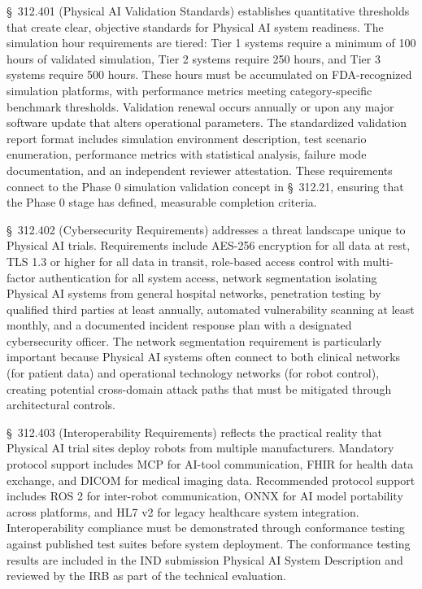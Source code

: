 \S~312.401 (Physical AI Validation Standards) establishes quantitative
thresholds that create clear, objective standards for Physical AI system
readiness. The simulation hour requirements are tiered: Tier 1 systems require
a minimum of 100 hours of validated simulation, Tier 2 systems require 250
hours, and Tier 3 systems require 500 hours. These hours must be accumulated
on FDA-recognized simulation platforms, with performance metrics meeting
category-specific benchmark thresholds. Validation renewal occurs annually or
upon any major software update that alters operational parameters. The
standardized validation report format includes simulation environment
description, test scenario enumeration, performance metrics with statistical
analysis, failure mode documentation, and an independent reviewer attestation.
These requirements connect to the Phase 0 simulation validation concept in
\S~312.21, ensuring that the Phase 0 stage has defined, measurable completion
criteria.

\S~312.402 (Cybersecurity Requirements) addresses a threat landscape unique to
Physical AI trials. Requirements include AES-256 encryption for all data at
rest, TLS 1.3 or higher for all data in transit, role-based access control
with multi-factor authentication for all system access, network segmentation
isolating Physical AI systems from general hospital networks, penetration
testing by qualified third parties at least annually, automated vulnerability
scanning at least monthly, and a documented incident response plan with a
designated cybersecurity officer. The network segmentation requirement is
particularly important because Physical AI systems often connect to both
clinical networks (for patient data) and operational technology networks (for
robot control), creating potential cross-domain attack paths that must be
mitigated through architectural controls.

\S~312.403 (Interoperability Requirements) reflects the practical reality that
Physical AI trial sites deploy robots from multiple manufacturers. Mandatory
protocol support includes MCP \cite{mcp-protocol} for AI-tool communication,
FHIR \cite{hl7-fhir} for health data exchange, and DICOM \cite{dicom} for
medical imaging data. Recommended protocol support includes ROS 2 for
inter-robot communication, ONNX for AI model portability across platforms, and
HL7 v2 for legacy healthcare system integration. Interoperability compliance
must be demonstrated through conformance testing against published test suites
before system deployment. The conformance testing results are included in the
IND submission Physical AI System Description and reviewed by the IRB as part
of the technical evaluation.

